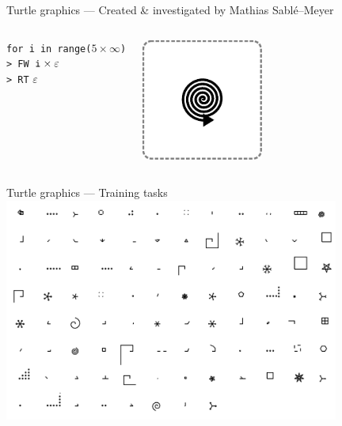 \documentclass{beamer}
\begin{document}
\begin{frame}{Turtle graphics --- \small{Created \& investigated by Mathias
  Sablé--Meyer}}
{\begin{columns}[T]
        \begin{mycode}
          \texttt{for i in range($5\times\infty$)}\\
          \texttt{> FW $\text{\texttt{i}}\times\varepsilon$}\\
          \texttt{> RT} $\varepsilon$\\
          \vspace*{3\baselineskip}
        \end{mycode}
        \includegraphics[width = 4cm]{figures/teachLogo/sspiral.eps}
    \end{columns}
  }
\end{frame}

\begin{frame}{Turtle graphics --- Training tasks}
  \centering
  \includegraphics[width=11cm]{figures/tasksMinusBehaviour.png}
\end{frame}
\end{document}
